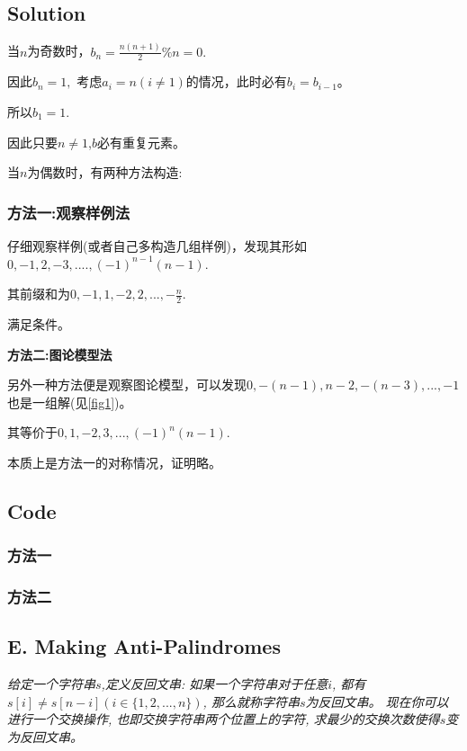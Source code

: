 \documentclass{article}
\begin{document}
    \subsection{Solution}

    当$n$为奇数时，$b_n = \frac{n(n+1)}{2} \% n = 0.$

    因此$b_n = 1,$ 考虑$a_i = n(i\neq 1)$的情况，此时必有$b_{i} = b_{i-1}$。

    所以$b_1 = 1$.

    因此只要$n \neq 1$,$b$必有重复元素。

    当$n$为偶数时，有两种方法构造:

    \subsubsection{方法一:观察样例法}
    
    仔细观察样例(或者自己多构造几组样例)，发现其形如$0,-1,2,-3,....,(-1)^{n-1} (n-1)$.

    其前缀和为$0,-1,1,-2,2,...,-\frac{n}{2}$.

    满足条件。

    \textbf{方法二:图论模型法}

    另外一种方法便是观察图论模型，可以发现$0,-(n-1),n-2,-(n-3),...,-1$也是一组解(见\ref{fig1})。

    其等价于$0,1,-2,3,...,(-1)^{n}(n-1)$.

    本质上是方法一的对称情况，证明略。

    \subsection{Code}
    
    \subsubsection{方法一}
    

    \subsubsection{方法二}
    


    \subsection{E. Making Anti-Palindromes}
    \emph{给定一个字符串$s$,定义反回文串: 如果一个字符串对于任意$i$, 都有$s[i] \neq s[n - i](i \in \{1,2,...,n\})$, 那么就称字符串$s$为反回文串。
     现在你可以进行一个交换操作, 也即交换字符串两个位置上的字符, 求最少的交换次数使得$s$变为反回文串。}
\end{document}
